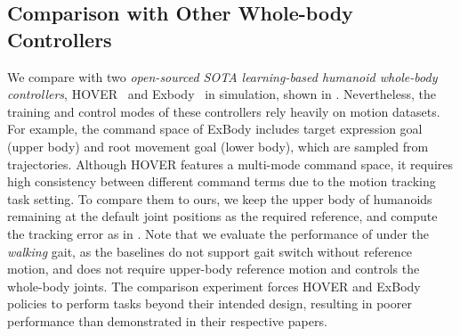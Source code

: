 \subsection{Comparison with Other Whole-body Controllers}
We compare \our with two \textit{open-sourced SOTA learning-based humanoid whole-body controllers}, HOVER~\citep{he2024hover} and Exbody~\citep{cheng2024expressive} in simulation, shown in . Nevertheless, the training and control modes of these controllers rely heavily on motion datasets. 
For example, the command space of ExBody includes target expression goal (upper body) and root movement goal (lower body), which are sampled from trajectories.
Although HOVER features a multi-mode command space, it requires high consistency between different command terms due to the motion tracking task setting.
To compare them to ours, we keep the upper body of humanoids remaining at the default joint positions as the required reference, and compute the tracking error as in .
Note that we evaluate the performance of \our under the \textit{walking} gait, as the baselines do not support gait switch without reference motion, and \our does not require upper-body reference motion and controls the whole-body joints.
The comparison experiment forces HOVER and ExBody policies to perform tasks beyond their intended design, resulting in poorer performance than demonstrated in their respective papers.

\begin{table}[htbp]
    \centering
    \caption{Single command tracking error comparison with learning based baselines.}
    \label{tab:baseline}
\end{table}